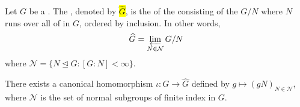 \begin{definition} \label{definition:profinite_completion_of_a_group}
Let $G$ be a . 
The , denoted by \hl{$\widehat{G}$}, is the  of the  consisting of the  $G/N$ where $N$ runs over all  of  in $G$, ordered by inclusion. In other words,
$$\widehat{G} = \varprojlim_{N \in \mathcal{N}} G/N$$
where $\mathcal{N} = \{ N \trianglelefteq G : [G:N] < \infty \}$.

There exists a canonical homomorphism $\iota: G \to \widehat{G}$ defined by $g \mapsto (gN)_{N \in \mathcal{N}}$, where $\mathcal{N}$ is the set of normal subgroups of finite index in $G$.
\end{definition}